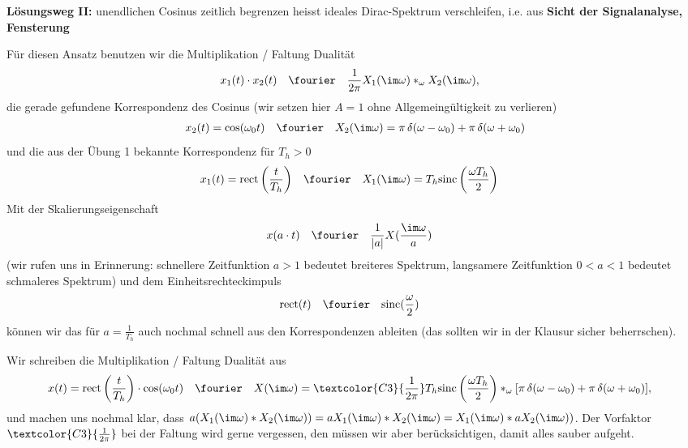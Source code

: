 \begin{ExCalc}
\textbf{Lösungsweg II:}
\textcolor{C0}{unendlichen} Cosinus
\textcolor{C3}{zeitlich begrenzen}
heisst
\textcolor{C0}{ideales} Dirac-Spektrum
\textcolor{C3}{verschleifen}, i.e. aus \textbf{Sicht der Signalanalyse, Fensterung}

Für diesen Ansatz benutzen wir die Multiplikation / Faltung Dualität
\begin{align}
x_1(t) \cdot x_2(t) &\quad \fourier \quad \frac{1}{2\pi} X_1(\im\omega) \ast_\omega X_2(\im\omega),
\end{align}
die gerade gefundene Korrespondenz des Cosinus
(wir setzen hier $A=1$ ohne Allgemeingültigkeit zu verlieren)
\begin{align}
x_2(t) = \cos(\omega_0 t) \quad\fourier\quad X_2(\im\omega) = \pi \, \delta(\omega-\omega_0) + \pi \, \delta(\omega+\omega_0)
\end{align}
und die aus der Übung 1 bekannte Korrespondenz für $T_h>0$
\begin{align}
x_1(t) = \mathrm{rect}\left(\frac{t}{T_h}\right) &\quad \fourier \quad X_1(\im\omega) = T_h \mathrm{sinc}\left(\frac{\omega T_h}{2}\right)
\end{align}
%
Mit der Skalierungseigenschaft
\begin{align}
x(a \cdot t) &\quad \fourier \quad \frac{1}{|a|}X(\frac{\im\omega}{a})
\end{align}
(wir rufen uns in Erinnerung: schnellere Zeitfunktion $a>1$ bedeutet breiteres Spektrum,
langsamere Zeitfunktion $0<a<1$ bedeutet schmaleres Spektrum)
%
und dem Einheitsrechteckimpuls
\begin{align}
\mathrm{rect}(t) &\quad \fourier \quad \mathrm{sinc}(\frac{\omega}{2})
\end{align}
%
können wir das für $a=\frac{1}{T_h}$ auch nochmal schnell aus den Korrespondenzen
ableiten (das sollten wir in der Klausur sicher beherrschen).

Wir schreiben die Multiplikation / Faltung Dualität aus
\begin{align}
x(t) = \mathrm{rect}\left(\frac{t}{T_h}\right) \cdot \cos(\omega_0 t)
&\quad \fourier \quad
X(\im\omega) = \textcolor{C3}{\frac{1}{2\pi}}
T_h \mathrm{sinc}\left(\frac{\omega T_h}{2}\right) \ast_\omega
[\pi \, \delta(\omega-\omega_0) + \pi \, \delta(\omega+\omega_0)],
\end{align}
und machen uns nochmal klar, dass
$a ( X_1(\im\omega) \ast X_2(\im\omega) ) = a X_1(\im\omega)\ast X_2(\im\omega) = X_1(\im\omega) \ast a X_2(\im\omega) )$.
%
Der Vorfaktor $\textcolor{C3}{\frac{1}{2\pi}}$ bei der Faltung wird gerne vergessen,
den müssen wir aber berücksichtigen, damit alles sauber aufgeht.


\end{ExCalc}

